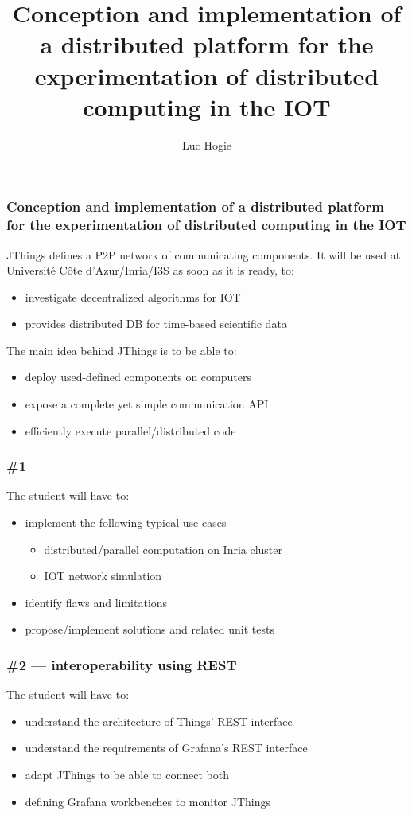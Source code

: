 \documentclass[11pt]{beamer}
\author{Luc Hogie}
\title{Conception and implementation of a distributed platform for the experimentation of distributed computing in the IOT}
\institute{Cnrs/Inria/Université Côte d'Azur}
\begin{document}
\begin{frame}
\titlepage
\end{frame}



\begin{frame}
\frametitle{Conception and implementation of a distributed platform for the experimentation of distributed computing in the IOT}
JThings defines a P2P network of communicating components.
It will be used at Université Côte d'Azur/Inria/I3S as soon as it is ready, to:
\begin{itemize}
	\item investigate decentralized algorithms for IOT
	\item provides distributed DB for time-based scientific data
\end{itemize}
The main idea behind JThings is to be able to:
\begin{itemize}
	\item deploy used-defined components on computers
	\item expose a complete yet simple communication API
	\item efficiently execute parallel/distributed code
\end{itemize}
\end{frame}


\begin{frame}
\frametitle{\#1}
The student will have to:
\begin{itemize}
	\item implement the following typical use cases
		\begin{itemize}
			\item distributed/parallel computation on Inria cluster
			\item IOT network simulation
		\end{itemize}
	\item identify flaws and limitations
	\item propose/implement solutions and related unit tests
\end{itemize}
\end{frame}


\begin{frame}
\frametitle{\#2 --- interoperability using REST}
The student will have to:
\begin{itemize}
	\item understand the architecture of  Things' REST interface
	\item understand the requirements of Grafana's REST interface
	\item adapt JThings to be able to connect both
	\item defining Grafana workbenches to monitor JThings
\end{itemize}
\end{frame}
\end{document}
